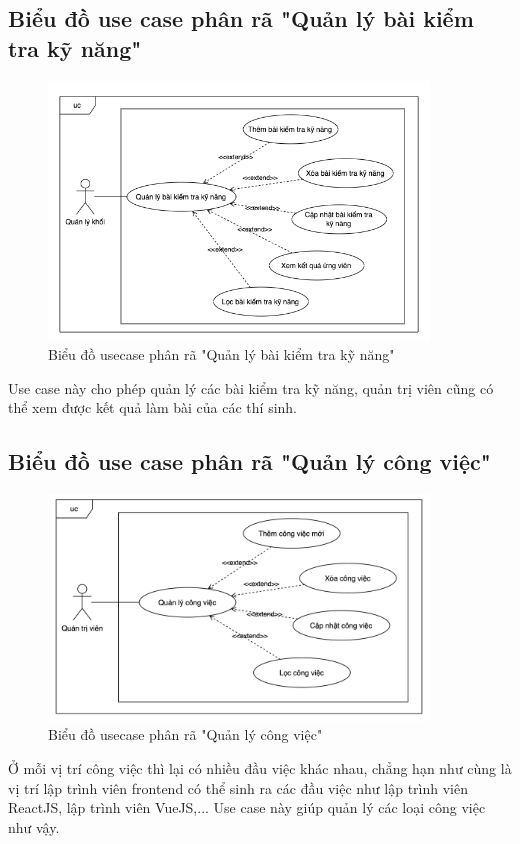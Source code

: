 \documentclass[../DoAn.tex]{subfiles}
\begin{document}
\subsection{Biểu đồ use case phân rã "Quản lý bài kiểm tra kỹ năng"}
\label{subsection:2.2.11}
\begin{figure}[H]
    \centering
    \includegraphics[width=0.9\textwidth]{Hinhve/UC_QuanLyBaiKiemTraKyNang.png}
    \caption{Biểu đồ usecase phân rã "Quản lý bài kiểm tra kỹ năng"}
\end{figure}
Use case này cho phép quản lý các bài kiểm tra kỹ năng, quản trị viên cũng có thể xem được kết quả làm bài của các thí sinh.

\subsection{Biểu đồ use case phân rã "Quản lý công việc"}
\label{subsection:2.2.12}
\begin{figure}[H]
    \centering
    \includegraphics[width=0.9\textwidth]{Hinhve/UC_QuanLyCongViec.png}
    \caption{Biểu đồ usecase phân rã "Quản lý công việc"}
\end{figure}
Ở mỗi vị trí công việc thì lại có nhiều đầu việc khác nhau, chẳng hạn như cùng là vị trí lập trình viên frontend có thể sinh ra các đầu việc như lập trình viên ReactJS, lập trình viên VueJS,... Use case này giúp quản lý các loại công việc như vậy.
\end{document}
